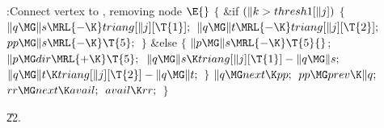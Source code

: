 \B{}:Connect vertex  to , removing node %
\X${}\E{}$\6
${}\{{}$\1\6
\&{if} ${}(\|k>\\{thresh1}[\|j]){}$\5
${}\{{}$\1\6
${}\|q\MG\|s\MRL{-{\K}}\\{triang}[\|j][\T{1}];{}$\6
${}\|q\MG\|t\MRL{-{\K}}\\{triang}[\|j][\T{2}];{}$\6
${}\\{pp}\MG\|s\MRL{-{\K}}\T{5};{}$\6
\4${}\}{}$\2\6
\&{else}\5
${}\{{}$\1\6
${}\|p\MG\|s\MRL{-{\K}}\T{5}{}$;\6
${}\|p\MG\\{dir}\MRL{+{\K}}\T{5};{}$\6
${}\|q\MG\|s\K\\{triang}[\|j][\T{1}]-\|q\MG\|s;{}$\6
${}\|q\MG\|t\K\\{triang}[\|j][\T{2}]-\|q\MG\|t;{}$\6
\4${}\}{}$\2\6
${}\|q\MG\\{next}\K\\{pp};{}$\6
${}\\{pp}\MG\\{prev}\K\|q;{}$\6
${}\\{rr}\MG\\{next}\K\\{avail};{}$\6
${}\\{avail}\K\\{rr};{}$\6
\4${}\}{}$\2\par
\U22.\fi

